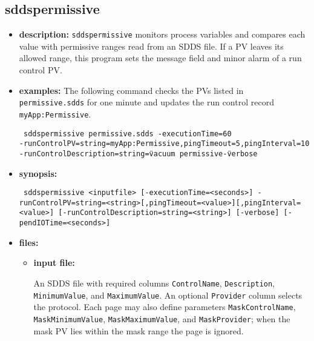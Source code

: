 %
%
\begin{latexonly}
\newpage
\end{latexonly}

\subsection{sddspermissive}
\label{sddspermissive}

\begin{itemize}
\item {\bf description:}
\verb+sddspermissive+ monitors process variables and compares each value with
permissive ranges read from an SDDS file.  If a PV leaves its allowed range,
this program sets the message field and minor alarm of a run control PV.

\item {\bf examples:}
The following command checks the PVs listed in \verb+permissive.sdds+ for one
minute and updates the run control record \verb+myApp:Permissive+.
\begin{flushleft}{\tt
sddspermissive permissive.sdds -executionTime=60\\
  -runControlPV=string=myApp:Permissive,pingTimeout=5,pingInterval=10\\
  -runControlDescription=string=\"vacuum permissive\" -verbose
}\end{flushleft}

\item {\bf synopsis:}
\begin{flushleft}{\tt
sddspermissive <inputfile>\
[-executionTime=<seconds>]\
-runControlPV=string=<string>[,pingTimeout=<value>][,pingInterval=<value>]\
[-runControlDescription=string=<string>]\
[-verbose] [-pendIOTime=<seconds>]
}\end{flushleft}

\item {\bf files:}
\begin{itemize}
\item {\bf input file:}\par
An SDDS file with required columns \verb+ControlName+, \verb+Description+,
\verb+MinimumValue+, and \verb+MaximumValue+.  An optional \verb+Provider+
column selects the protocol.  Each page may also define parameters
\verb+MaskControlName+, \verb+MaskMinimumValue+, \verb+MaskMaximumValue+,
and \verb+MaskProvider+; when the mask PV lies within the mask range the page
is ignored.
\end{itemize}


\end{itemize}
